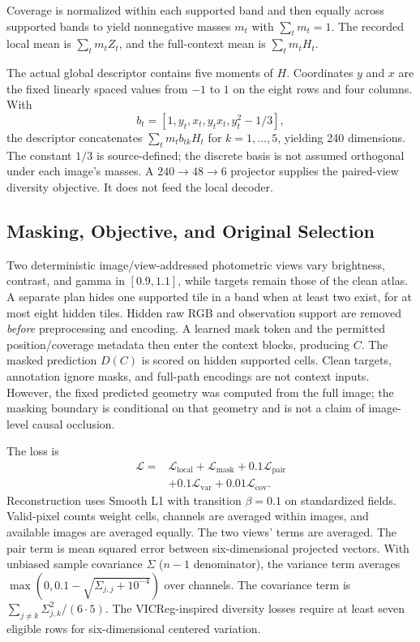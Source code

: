 Coverage is normalized within each supported band and then equally across supported bands to yield nonnegative masses $m_t$ with $\sum_t m_t=1$. The recorded local mean is $\sum_t m_t Z_t$, and the full-context mean is $\sum_t m_t H_t$.

The actual global descriptor contains five moments of $H$. Coordinates $y$ and $x$ are the fixed linearly spaced values from $-1$ to $1$ on the eight rows and four columns. With
\begin{equation}
 b_t=[1,y_t,x_t,y_tx_t,y_t^2-1/3],
\end{equation}
the descriptor concatenates $\sum_t m_t b_{tk}H_t$ for $k=1,\ldots,5$, yielding 240 dimensions. The constant $1/3$ is source-defined; the discrete basis is not assumed orthogonal under each image's masses. A $240\rightarrow48\rightarrow6$ projector supplies the paired-view diversity objective. It does not feed the local decoder.

\subsection{Masking, Objective, and Original Selection}\label{sec:training}
Two deterministic image/view-addressed photometric views vary brightness, contrast, and gamma in $[0.9,1.1]$, while targets remain those of the clean atlas. A separate plan hides one supported tile in a band when at least two exist, for at most eight hidden tiles. Hidden raw RGB and observation support are removed \emph{before} preprocessing and encoding. A learned mask token and the permitted position/coverage metadata then enter the context blocks, producing $C$. The masked prediction $D(C)$ is scored on hidden supported cells. Clean targets, annotation ignore masks, and full-path encodings are not context inputs. However, the fixed predicted geometry was computed from the full image; the masking boundary is conditional on that geometry and is not a claim of image-level causal occlusion.

The loss is
\begin{equation}\label{eq:loss}
\begin{split}
\mathcal{L}={}&\mathcal{L}_{\mathrm{local}}+\mathcal{L}_{\mathrm{mask}}
 +0.1\mathcal{L}_{\mathrm{pair}}\\
 &+0.1\mathcal{L}_{\mathrm{var}}+0.01\mathcal{L}_{\mathrm{cov}}.
\end{split}
\end{equation}
Reconstruction uses Smooth L1 with transition $\beta=0.1$ on standardized fields. Valid-pixel counts weight cells, channels are averaged within images, and available images are averaged equally. The two views' terms are averaged. The pair term is mean squared error between six-dimensional projected vectors. With unbiased sample covariance $\Sigma$ ($n-1$ denominator), the variance term averages $\max(0,0.1-\sqrt{\Sigma_{j,j}+10^{-4}})$ over channels. The covariance term is $\sum_{j\ne k}\Sigma_{j,k}^2/(6\cdot5)$. The VICReg-inspired diversity losses require at least seven eligible rows for six-dimensional centered variation.

